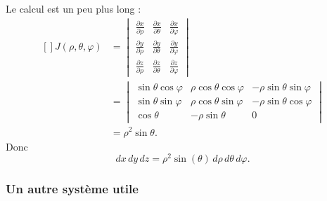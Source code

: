 Le calcul est un peu plus long :
\begin{equation}
    \begin{aligned}[]
        J(\rho,\theta,\varphi)&=\begin{vmatrix}
            \frac{ \partial x }{ \partial \rho }    &   \frac{ \partial x }{ \partial \theta }    &   \frac{ \partial x }{ \partial \varphi }    \\
            \frac{ \partial y }{ \partial \rho }    &   \frac{ \partial y }{ \partial \theta }    &   \frac{ \partial y }{ \partial \varphi }    \\
            \frac{ \partial z }{ \partial \rho }    &   \frac{ \partial z }{ \partial \theta }    &   \frac{ \partial z }{ \partial \varphi }
        \end{vmatrix}\\
        &=
        \begin{vmatrix}
            \sin\theta\cos\varphi    &   \rho\cos\theta\cos\varphi    &   -\rho\sin\theta\sin\varphi    \\
            \sin\theta\sin\varphi    &   \rho\cos\theta\sin\varphi    &   -\rho\sin\theta\cos\varphi    \\
            \cos\theta               &   -\rho\sin\theta              &   0
        \end{vmatrix}\\
        &=\rho^2\sin\theta.
    \end{aligned}
\end{equation}
Donc
\begin{equation}
    dx\,dy\,dz=\rho^2\sin(\theta)\,d\rho\,d\theta\,d\varphi.
\end{equation}

\subsubsection{Un autre système utile}

